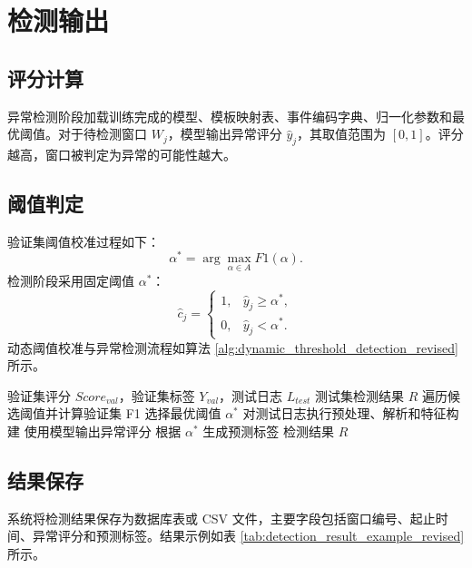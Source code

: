 \section{检测输出}

\subsection{评分计算}

异常检测阶段加载训练完成的模型、模板映射表、事件编码字典、归一化参数和最优阈值。对于待检测窗口 $W_j$，模型输出异常评分 $\hat{y}_j$，其取值范围为 $[0,1]$。评分越高，窗口被判定为异常的可能性越大。

\subsection{阈值判定}

验证集阈值校准过程如下：
\begin{equation}
    \alpha^*=\arg\max_{\alpha\in A}F1(\alpha).
\end{equation}
检测阶段采用固定阈值 $\alpha^*$：
\begin{equation}
    \hat{c}_j=
    \begin{cases}
        1, & \hat{y}_j\geq \alpha^*,\\
        0, & \hat{y}_j<\alpha^*.
    \end{cases}
\end{equation}
动态阈值校准与异常检测流程如算法 \ref{alg:dynamic_threshold_detection_revised} 所示。

\begin{algorithm}[htbp]
    \caption{动态阈值校准与异常检测流程}
    \label{alg:dynamic_threshold_detection_revised}
    \begin{algorithmic}[1]
        \REQUIRE 验证集评分 $Score_{val}$，验证集标签 $Y_{val}$，测试日志 $L_{test}$
        \ENSURE 测试集检测结果 $R$
        \STATE 遍历候选阈值并计算验证集 F1
        \STATE 选择最优阈值 $\alpha^*$
        \STATE 对测试日志执行预处理、解析和特征构建
        \STATE 使用模型输出异常评分
        \STATE 根据 $\alpha^*$ 生成预测标签
        \RETURN 检测结果 $R$
    \end{algorithmic}
\end{algorithm}

\subsection{结果保存}

系统将检测结果保存为数据库表或 CSV 文件，主要字段包括窗口编号、起止时间、异常评分和预测标签。结果示例如表 \ref{tab:detection_result_example_revised} 所示。

